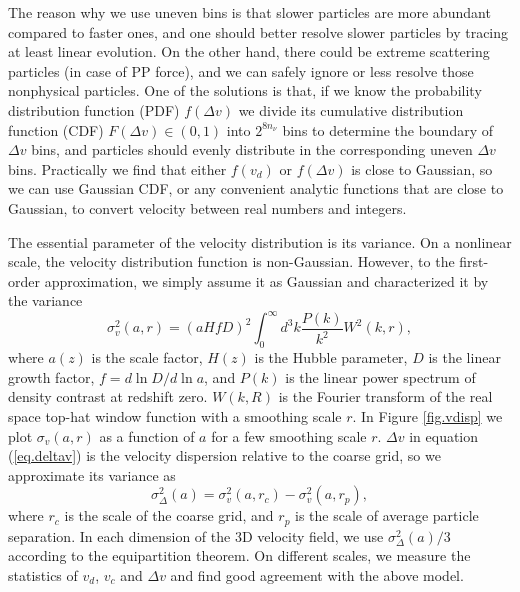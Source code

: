 \documentclass[10pt,twocolumn,reprint]{emulateapj}
\begin{document}
The reason why we use uneven bins is that slower particles are more abundant compared to faster ones, and one should better resolve slower particles by tracing at least linear evolution. On the other hand, there could be extreme scattering particles (in case of PP force), and we can safely ignore or less resolve those nonphysical particles. One of the solutions is that, if we know the probability distribution function (PDF) $f(\Delta v)$ we divide its cumulative distribution function (CDF) $F(\Delta v)\in(0,1)$ into $2^{8n_\nu}$ bins to determine the boundary of $\Delta v$ bins, and particles should evenly distribute in the corresponding uneven $\Delta v$ bins. Practically we find that either $f(v_d)$ or $f(\Delta v)$ is close to Gaussian, so we can use Gaussian CDF, or any convenient analytic functions that are close to Gaussian, to convert velocity between real numbers and integers.

The essential parameter of the velocity distribution is its variance. On a nonlinear scale, the velocity distribution function is non-Gaussian. However, to the first-order approximation, we simply assume it as Gaussian and characterized it by the variance
\begin{equation}\label{eq.vdisp}
	\sigma^2_v(a,r) = (a H f D)^2 \int_0^\infty d^3k\frac{P(k)}{k^2}W^2(k,r),
\end{equation}
where $a(z)$ is the scale factor, $H(z)$ is the Hubble parameter, $D$ is the linear growth factor, $f=d \ln D/d\ln a$, and $P(k)$ is the linear power spectrum of density contrast at redshift zero. $W(k,R)$ is the Fourier transform of the real space top-hat window function with a smoothing scale $r$. In Figure \ref{fig.vdisp} we plot $\sigma_v(a,r)$ as a function of $a$ for a few smoothing scale $r$. $\Delta v$ in equation (\ref{eq.deltav}) is the velocity dispersion relative to the coarse grid, so we approximate its variance as
\begin{equation}\label{eq.vdelta}
	\sigma^2_{\Delta}(a)=\sigma^2_v(a,r_c)-\sigma^2_v(a,r_p),
\end{equation}
where $r_c$ is the scale of the coarse grid, and $r_p$ is the scale of average particle separation. In each dimension of the 3D velocity field, we use $\sigma^2_{\Delta}(a)/3$ according to the equipartition theorem. On different scales, we measure the statistics of $v_d$, $v_c$ and $\Delta v$ and find good agreement with the above model.
\end{document}
